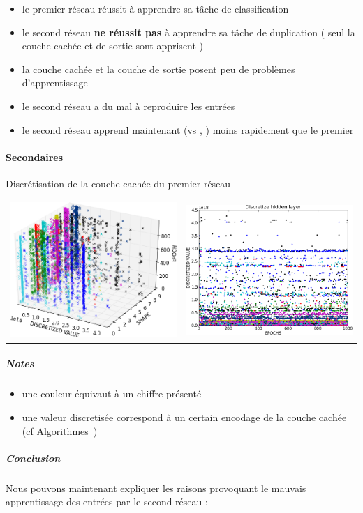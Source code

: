 	\begin{itemize}
	  \item le premier réseau réussit à apprendre sa tâche de classification
	  \item le second réseau \textbf{ne réussit pas} à apprendre sa tâche de duplication ( seul la couche cachée et de sortie sont apprisent )
	  \item la couche cachée et la couche de sortie posent peu de problèmes d'apprentissage
	  \item le second réseau a du mal à reproduire les entrées
	  \item le second réseau apprend maintenant (vs , ) moins rapidement que le premier
	\end{itemize}
    \paragraph{Secondaires}
      Discrétisation de la couche cachée du premier réseau
      \begin{center}
	\begin{tabular}{lr}
	  \hspace*{-1cm}
	  \includegraphics[width=250px]{data/expA3/discretize_cloud.png}
	  &
	  \includegraphics[width=250px]{data/expA3/discretize.png} 
	\end{tabular}
      \end{center} 
      \subparagraph{Notes}
	\begin{itemize}
	  \item une couleur équivaut à un chiffre présenté
	  \item une valeur discretisée correspond à un certain encodage de la couche cachée (cf Algorithmes~)
	\end{itemize}
      \subparagraph{Conclusion}
	Nous pouvons maintenant expliquer les raisons provoquant le mauvais apprentissage des entrées par le second réseau :
	
